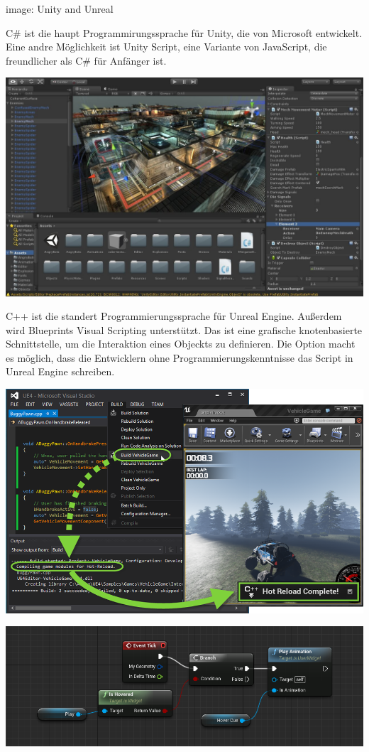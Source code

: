   image: Unity and Unreal

  C\# ist die haupt Programmirungssprache für Unity, die von Microsoft entwickelt. Eine andre Möglichkeit ist Unity Script, eine Variante von JavaScript, die freundlicher als C\# für Anfänger ist.
  
  \includegraphics[width=\textwidth]{images/unity.jpg}
  
  C++ ist die standert Programmierungssprache für Unreal Engine. Außerdem wird Blueprints Visual Scripting unterstützt. Das ist eine grafische knotenbasierte Schnittstelle, um die Interaktion eines Objeckts zu definieren. Die Option macht es möglich, dass die Entwicklern ohne Programmierungskenntnisse das Script in Unreal Engine schreiben.
  
  \includegraphics[width=\textwidth]{images/uec.png}
  
  \includegraphics[width=\textwidth]{images/ueblueprint.png}
  

